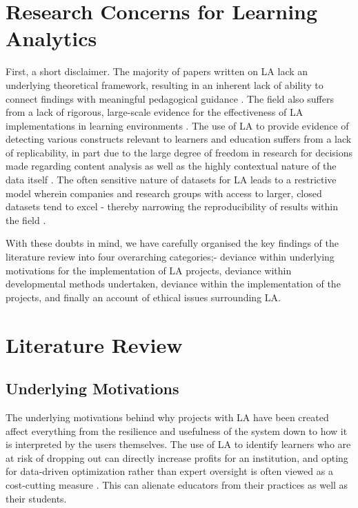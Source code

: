 \documentclass{l4proj}
\begin{document}
\section{Research Concerns for Learning Analytics}
First, a short disclaimer. The majority of papers written on LA lack an underlying theoretical framework, resulting in an inherent lack of ability to connect findings with meaningful pedagogical guidance \citep{Baek2023Educational2019, Banihashem2019InvestigationAnalytics, BuchnerPersonalisedModel}. The field also suffers from a lack of rigorous, large-scale evidence for the effectiveness of LA implementations in learning environments \citep{Ifenthaler2020UtilisingReview}. The use of LA to provide evidence of detecting various constructs relevant to learners and education suffers from a lack of replicability, in part due to the large degree of freedom in research for decisions made regarding content analysis as well as the highly contextual nature of the data itself \citep{Kitto_Manly_Ferguson_Poquet_2023}. The often sensitive nature of datasets for LA leads to a restrictive model wherein companies and research groups with access to larger, closed datasets tend to excel - thereby narrowing the reproducibility of results within the field \citep{Kitto_Manly_Ferguson_Poquet_2023}. 

With these doubts in mind, we have carefully organised the key findings of the literature review into four overarching categories;- deviance within underlying motivations for the implementation of LA projects, deviance within developmental methods undertaken, deviance within the implementation of the projects, and finally an account of ethical issues surrounding LA. 


\section{Literature Review}
\subsection{Underlying Motivations}
The underlying motivations behind why projects with LA have been created affect everything from the resilience and usefulness of the system down to how it is interpreted by the users themselves. The use of LA to identify learners who are at risk of dropping out can directly increase profits for an institution, and opting for data-driven optimization rather than expert oversight is often viewed as a cost-cutting measure \citep{Yen-TingLiuLearningPoint}. This can alienate educators from their practices as well as their students. 
\end{document}
